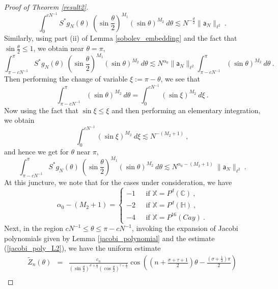 \documentclass[12pt]{amsart}
\theoremstyle{definition}
\newcommand{\C}{\mathbb C}%
\newcommand{\X}{\mathbb X}%
\newcommand{\Hb}{\mathbb H}%
\newcommand{\sa}{\textsf{a}}
\numberwithin{equation}{section}
\begin{document}
\begin{proof}[Proof of Theorem \ref{result2}]
\begin{equation}\label{result2_pf_eq4}
\int_0^{cN^{-1}} S^*g_N(\theta)\:{\left(\sin \frac{\theta}{2}\right)}^{M_1} {(\sin \theta)}^{M_2}\:d\theta \lesssim N^{-\frac{d}{2}} \|\sa_N\|_{\ell^2}\:.
\end{equation}
Similarly, using part (ii) of Lemma \ref{sobolev_embedding} and the fact that $\sin\frac{\theta}{2} \le 1$, we obtain near $\theta=\pi$,
\begin{equation*}
\int_{\pi-cN^{-1}}^\pi S^*g_N(\theta)\:{\left(\sin \frac{\theta}{2}\right)}^{M_1} {(\sin \theta)}^{M_2}\:d\theta \lesssim N^{\alpha_0} \|\sa_N\|_{\ell^2}\int_{\pi-cN^{-1}}^\pi {(\sin \theta)}^{M_2}\:d\theta  \:.
\end{equation*}
Then performing the change of variable $\xi:=\pi - \theta$, we see that
\begin{equation*}
\int_{\pi-cN^{-1}}^\pi {(\sin \theta)}^{M_2}\:d\theta = \int_0^{cN^{-1}} {(\sin \xi)}^{M_2}\:d\xi\:. 
\end{equation*}
Now using the fact that $\sin \xi \le \xi$ and then performing an elementary integration, we obtain
\begin{equation*}
\int_0^{cN^{-1}} {(\sin \xi)}^{M_2}\:d\xi \lesssim N^{-(M_2+1)}\:,
\end{equation*}
and hence we get for $\theta$ near $\pi$,
\begin{equation}\label{result2_pf_eq5}
\int_{\pi-cN^{-1}}^\pi S^*g_N(\theta)\:{\left(\sin \frac{\theta}{2}\right)}^{M_1} {(\sin \theta)}^{M_2}\:d\theta \lesssim N^{\alpha_0-(M_2+1)}\:\|\sa_N\|_{\ell^2}\:.
\end{equation}
At this juncture, we note that for the cases under consideration, we have 
\begin{equation} \label{result2_pf_eq6}
\alpha_0-(M_2+1) = 
\begin{cases}
-1\:\:\:&\text{if } \X=P^d(\C)\:,\\
-2\:\:\:&\text{if } \X=P^d(\Hb)\:,\\
-4\:\:\:&\text{if } \X=P^{16}(Cay)\:.
\end{cases}
\end{equation}
Next, in the region $cN^{-1} \le \theta \le \pi - cN^{-1}$, invoking the expansion of Jacobi polynomials given by Lemma \ref{jacobi_polynomial} and  the estimate (\ref{jacobi_poly_L2}), we have the uniform estimate
\begin{eqnarray} \label{result2_pf_eq7}
\tilde{Z}_n(\theta)&=&\frac{c_n}{\left(\sin\frac{\theta}{2}\right)^{\sigma+\frac{1}{2}}\left(\cos\frac{\theta}{2}\right)^{\tau+\frac{1}{2}}}\cos\left(\left(n+\frac{\sigma+\tau+1}{2}\right)\theta-\frac{\left(\sigma +\frac{1}{2}\right)\pi}{2}\right)\nonumber\\

\end{eqnarray}
\end{proof}
\end{document}
